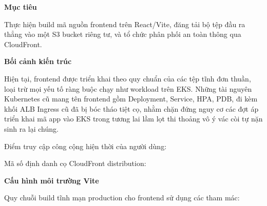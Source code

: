 \vspace{0.5em}\noindent\textbf{Mục tiêu}\par

Thực hiện build mã nguồn frontend trên React/Vite, đăng tải bộ tệp đầu
ra thẳng vào một S3 bucket riêng tư, và tổ chức phân phối an toàn thông
qua CloudFront.

\vspace{0.5em}\noindent\textbf{Bối cảnh kiến
trúc}\par

Hiện tại, frontend được triển khai theo quy chuẩn của các tệp tĩnh đơn
thuần, loại trừ mọi yếu tố ràng buộc chạy như workload trên EKS. Những
tài nguyên Kubernetes cũ mang tên frontend gồm Deployment, Service, HPA,
PDB, đi kèm khối ALB Ingress cũ đã bị bóc tháo tiệt cọ, nhằm chặn đứng
nguy cơ các đợt áp triển khai mã app vào EKS trong tương lai lầm lọt thi
thoảng vô ý vác còi tự nặn sinh ra lại chúng.

Điểm truy cập công cộng hiện thời của người dùng:

\begin{Shaded}
\begin{Highlighting}[]
\end{Highlighting}
\end{Shaded}

Mã số định danh cọ CloudFront distribution:

\begin{Shaded}
\begin{Highlighting}[]
\end{Highlighting}
\end{Shaded}

\vspace{0.5em}\noindent\textbf{Cấu hình môi trường
Vite}\par

Quy chuỗi build tĩnh mạn production cho frontend sử dụng các tham mác:

